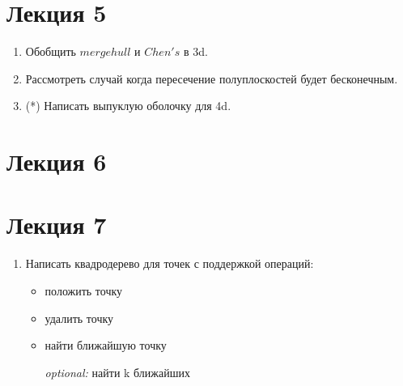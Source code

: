 \documentclass[12pt,a4paper,oneside]{article}
\begin{document}
\section*{Лекция 5}
	\begin{enumerate}
		\item Обобщить $mergehull$ и $Chen's$ в 3d.
		\item Рассмотреть случай когда пересечение полуплоскостей будет бесконечным.
		\item (*) Написать выпуклую оболочку для 4d.
	\end{enumerate}

\section*{Лекция 6}

\section*{Лекция 7}
	\begin{enumerate}
		\item Написать квадродерево для точек с поддержкой операций: 
		\begin{itemize}
			\item положить точку
			\item удалить точку
			\item найти ближайшую точку
			\item[\it optional:] найти k ближайших
		\end{itemize}
	\end{enumerate}
\end{document}
